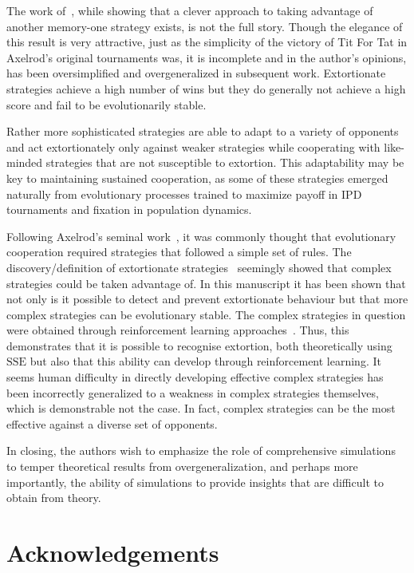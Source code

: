 \documentclass[a4paper]{article}
\newcommand{\SSe}{\text{SSE}}
\begin{document}
The work of~\cite{Press2012}, while showing that a clever approach to taking
advantage of another memory-one strategy exists, is not the full story.
Though the elegance of this result is very attractive, just as the simplicity of
the victory of Tit For Tat in Axelrod's original tournaments was, it is
incomplete and in the author's opinions, has been oversimplified and
overgeneralized in subsequent work. Extortionate strategies achieve a high
number of wins but they do generally not achieve a high score and fail to be
evolutionarily stable.

Rather more sophisticated strategies are able to adapt to a variety of opponents
and act extortionately only against weaker strategies while cooperating with
like-minded strategies that are not susceptible to extortion. This adaptability
may be key to maintaining sustained cooperation, as some of these strategies
emerged naturally from evolutionary processes trained to maximize payoff in
IPD tournaments and fixation in population dynamics.

Following Axelrod's seminal work~\cite{Axelrod1980, Axelrod1980a}, it was
commonly thought that evolutionary cooperation required strategies that followed
a simple set of rules. The discovery/definition of extortionate
strategies~\cite{Press2012} seemingly showed that complex strategies could be
taken advantage of. In this manuscript it has been shown that not only is it
possible to detect and prevent extortionate behaviour but that more complex
strategies can be evolutionary stable. The complex strategies in question were
obtained through reinforcement learning approaches~\cite{Harper2017, Moran1707}.
Thus, this demonstrates that it is possible to recognise extortion, both
theoretically using \(\SSe\) but also that this ability can develop through
reinforcement learning. It seems human difficulty in directly developing
effective complex strategies has been incorrectly generalized to a weakness
in complex strategies themselves, which is demonstrable not the case. In fact,
complex strategies can be the most effective against a diverse set of opponents.

In closing, the authors wish to emphasize the role of comprehensive simulations to temper
theoretical results from overgeneralization, and perhaps more importantly, the
ability of simulations to provide insights that are difficult to obtain from theory.

\section*{Acknowledgements}
\end{document}
